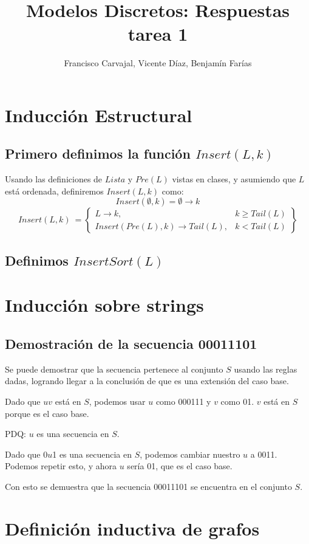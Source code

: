 \documentclass{article}
\title{Modelos Discretos: Respuestas tarea 1}
\author{Francisco Carvajal, Vicente Díaz, Benjamín Farías}
\begin{document}
\maketitle

\section{Inducción Estructural}
\subsection{Primero definimos la función $Insert(L,k)$}
Usando las definiciones de $Lista$ y $Pre(L)$ vistas en clases, y asumiendo que $L$ está ordenada, definiremos $Insert(L,k)$ como:
\[Insert(\emptyset,k) = \emptyset \rightarrow k\]
\[Insert(L,k)\ = \left\{\begin{array}{lr}
  L \rightarrow k, & k \ge Tail(L)\\
  Insert(Pre(L),k) \rightarrow Tail(L), & k < Tail(L)
\end{array}\right\}
\]

\subsection{Definimos $InsertSort(L)$}

\section{Inducción sobre strings}

\subsection{Demostración de la secuencia 00011101}
Se puede demostrar que la secuencia pertenece al conjunto \(S\) usando las reglas dadas, logrando llegar a la conclusión de que es una extensión del caso base.

Dado que \(uv\) está en \(S\), podemos usar \(u\) como 000111 y \(v\) como 01. \(v\) está en \(S\) porque es el caso base.

PDQ: \(u\) es una secuencia en \(S\).

Dado que 0\(u\)1 es una secuencia en \(S\), podemos cambiar nuestro \(u\) a 0011. Podemos repetir esto, y ahora \(u\) sería 01, que es el caso base.

Con esto se demuestra que la secuencia 00011101 se encuentra en el conjunto \(S\).

\section{Definición inductiva de grafos}
\end{document}
